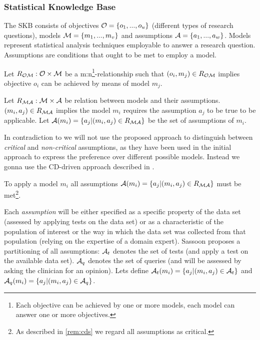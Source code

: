 \subsubsection{Statistical Knowledge Base}
\label{sub:SKB}

The \gls{SKB} consists of objectives $\mathcal{O}=\{o_1, ..., o_u\}$ (different types of research questions), models $\mathcal{M}=\{m_1, ..., m_v\}$ and assumptions $\mathcal{A} = \{a_1, ..., a_w\}$. Models represent statistical analysis techniques employable to answer a research question. Assumptions are conditions that ought to be met to employ a model.

\begin{definition}
	Let $R_{\mathcal{O}\mathcal{M}}: \mathcal{O} \times \mathcal{M}$ be a m:n\footnote{Each objective can be achieved by one or more models, each model can answer one or more objectives.}-relationship such that $(o_i, m_j)\in R_{\mathcal{O}\mathcal{M}}$ implies objective $o_i$ can be achieved by means of model $m_j$. 
\end{definition}

\begin{definition}
	Let $R_{\mathcal{M}\mathcal{A}}: \mathcal{M} \times \mathcal{A}$ be relation between models and their assumptions. $(m_i, a_j)\in R_{\mathcal{M}\mathcal{A}}$ implies  the model $m_i$ requires the assumption $a_j$ to be true to be applicable. Let $\mathcal{A}(m_i) = \{a_j | (m_i, a_j) \in R_{\mathcal{M}\mathcal{A}}\}$ be the set of assumptions of $m_i$.
\end{definition}

\begin{remark}
In contradiction to \cite{sassoon2014} we will not use the proposed approach to distinguish between \textit{critical} and \textit{non-critical} assumptions, as they have been used in the initial approach to express the preference over different possible models. Instead we gonna use the \gls{CD}-driven approach described in \cite{sassoon2016CD}.
\label{rem:cds}
\end{remark}


\begin{definition}
To apply a model $m_i$ all assumptions $\mathcal{A}(m_i) = \{a_j | (m_i, a_j) \in R_{\mathcal{M}\mathcal{A}} \}$ must be met\footnote{As described in \cref{rem:cds} we regard all assumptions as critical.}.
\end{definition}

Each \textit{assumption} will be either specified as a specific property of the data set (assessed by applying tests on the data set) or as a characteristic of the population of interest or the way in which the data set was collected from that population (relying on the expertise of a domain expert). Sassoon proposes a partitioning of all assumptions: $\mathcal{A}_t$ denotes the set of tests (and apply a test on the available data set). $\mathcal{A}_q$ denotes the set of queries (and will be assessed by asking the clinician for an opinion). Lets define $\mathcal{A}_t(m_i)= \{a_j| (m_i, a_j) \in \mathcal{A}_t\}$ and $\mathcal{A}_q(m_i)= \{a_j| (m_i, a_j) \in \mathcal{A}_q\}$. 

